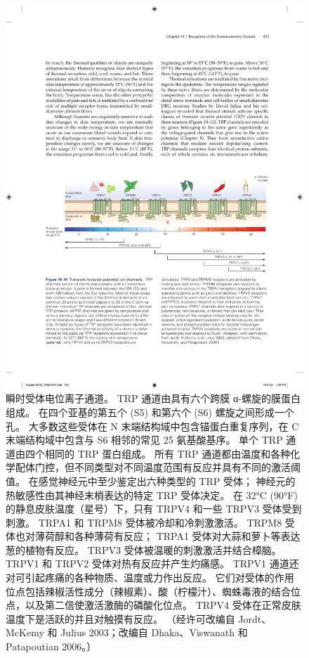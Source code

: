 \begin{figure}[htbp]
	\centering
	\includegraphics[width=1.0\linewidth]{chap18/fig_18_10}
	\caption{瞬时受体电位离子通道。
		TRP 通道由具有六个跨膜 α-螺旋的膜蛋白组成。
		在四个亚基的第五个 (S5) 和第六个 (S6) 螺旋之间形成一个孔。
		大多数这些受体在 N 末端结构域中包含锚蛋白重复序列，在 C 末端结构域中包含与 S6 相邻的常见 25 氨基酸基序。
		单个 TRP 通道由四个相同的 TRP 蛋白组成。
		所有 TRP 通道都由温度和各种化学配体门控，但不同类型对不同温度范围有反应并具有不同的激活阈值。
		在感觉神经元中至少鉴定出六种类型的 TRP 受体； 神经元的热敏感性由其神经末梢表达的特定 TRP 受体决定。
		在 32°C (90°F) 的静息皮肤温度（星号）下，只有 TRPV4 和一些 TRPV3 受体受到刺激。
		TRPA1 和 TRPM8 受体被冷却和冷刺激激活。
		TRPM8 受体也对薄荷醇和各种薄荷有反应； TRPA1 受体对大蒜和萝卜等表达葱的植物有反应。
		TRPV3 受体被温暖的刺激激活并结合樟脑。
		TRPV1 和 TRPV2 受体对热有反应并产生灼痛感。 
		TRPV1 通道还对可引起疼痛的各种物质、温度或力作出反应。
		它们对受体的作用位点包括辣椒活性成分（辣椒素）、酸（柠檬汁）、蜘蛛毒液的结合位点，以及第二信使激活激酶的磷酸化位点。
		TRPV4 受体在正常皮肤温度下是活跃的并且对触摸有反应。 （经许可改编自 Jordt、McKemy 和 Julius 2003；改编自 Dhaka、Viswanath 和 Patapoutian 2006。）}
	\label{fig:18_10}
\end{figure}


